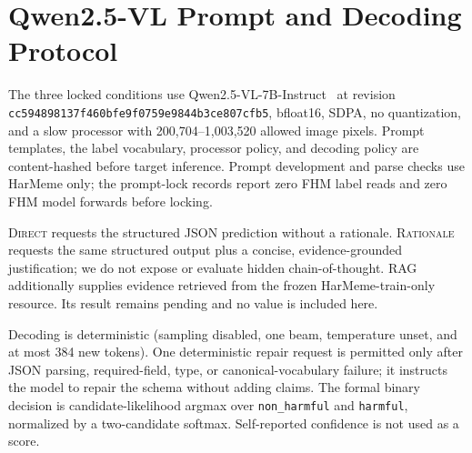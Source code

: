 \section{Qwen2.5-VL Prompt and Decoding Protocol}
\label{sec:supp:qwen}

The three locked conditions use Qwen2.5-VL-7B-Instruct~\cite{bai2025qwen25vl}
at revision \nolinkurl{cc594898137f460bfe9f0759e9844b3ce807cfb5}, bfloat16,
SDPA, no quantization, and a slow processor with 200,704--1,003,520 allowed
image pixels.  Prompt templates, the label vocabulary, processor policy, and
decoding policy are content-hashed before target inference.  Prompt
development and parse checks use HarMeme only; the prompt-lock records report
zero FHM label reads and zero FHM model forwards before locking.

\textsc{Direct} requests the structured JSON prediction without a rationale.
\textsc{Rationale} requests the same structured output plus a concise,
evidence-grounded justification; we do not expose or evaluate hidden
chain-of-thought.  \textsc{RAG} additionally supplies evidence retrieved from
the frozen HarMeme-train-only resource.  Its result remains pending and no
value is included here.

Decoding is deterministic (sampling disabled, one beam, temperature unset,
and at most 384 new tokens).  One deterministic repair request is permitted
only after JSON parsing, required-field, type, or canonical-vocabulary
failure; it instructs the model to repair the schema without adding claims.
The formal binary decision is candidate-likelihood argmax over
\texttt{non\_harmful} and \texttt{harmful}, normalized by a two-candidate
softmax.  Self-reported confidence is not used as a score.
